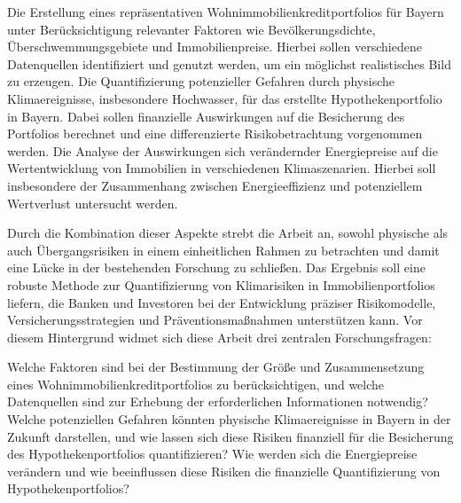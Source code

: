 Die Erstellung eines repräsentativen Wohnimmobilienkreditportfolios für Bayern unter Berücksichtigung relevanter Faktoren wie Bevölkerungsdichte, Überschwemmungsgebiete und Immobilienpreise. Hierbei sollen verschiedene Datenquellen identifiziert und genutzt werden, um ein möglichst realistisches Bild zu erzeugen.
Die Quantifizierung potenzieller Gefahren durch physische Klimaereignisse, insbesondere Hochwasser, für das erstellte Hypothekenportfolio in Bayern. Dabei sollen finanzielle Auswirkungen auf die Besicherung des Portfolios berechnet und eine differenzierte Risikobetrachtung vorgenommen werden.
Die Analyse der Auswirkungen sich verändernder Energiepreise auf die Wertentwicklung von Immobilien in verschiedenen Klimaszenarien. Hierbei soll insbesondere der Zusammenhang zwischen Energieeffizienz und potenziellem Wertverlust untersucht werden.

Durch die Kombination dieser Aspekte strebt die Arbeit an, sowohl physische als auch Übergangsrisiken in einem einheitlichen Rahmen zu betrachten und damit eine Lücke in der bestehenden Forschung zu schließen. Das Ergebnis soll eine robuste Methode zur Quantifizierung von Klimarisiken in Immobilienportfolios liefern, die Banken und Investoren bei der Entwicklung präziser Risikomodelle, Versicherungsstrategien und Präventionsmaßnahmen unterstützen kann.
Vor diesem Hintergrund widmet sich diese Arbeit drei zentralen Forschungsfragen:

Welche Faktoren sind bei der Bestimmung der Größe und Zusammensetzung eines Wohnimmobilienkreditportfolios zu berücksichtigen, und welche Datenquellen sind zur Erhebung der erforderlichen Informationen notwendig?
Welche potenziellen Gefahren könnten physische Klimaereignisse in Bayern in der Zukunft darstellen, und wie lassen sich diese Risiken finanziell für die Besicherung des Hypothekenportfolios quantifizieren?
Wie werden sich die Energiepreise verändern und wie beeinflussen diese Risiken die finanzielle Quantifizierung von Hypothekenportfolios?

